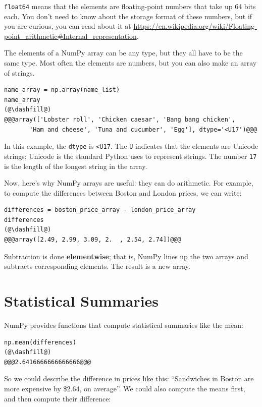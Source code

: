 \passthrough{\lstinline!float64!} means that the elements are
floating-point numbers that take up 64 bits each. You don't need to know
about the storage format of these numbers, but if you are curious, you
can read about it at
\url{https://en.wikipedia.org/wiki/Floating-point_arithmetic\#Internal_representation}.

The elements of a NumPy array can be any type, but they all have to be
the same type. Most often the elements are numbers, but you can also
make an array of strings.

\begin{lstlisting}[]
name_array = np.array(name_list)
name_array
(@\dashfill@)
@@@array(['Lobster roll', 'Chicken caesar', 'Bang bang chicken',
       'Ham and cheese', 'Tuna and cucumber', 'Egg'], dtype='<U17')@@@
\end{lstlisting}

In this example, the \passthrough{\lstinline!dtype!} is
\passthrough{\lstinline!<U17!}. The \passthrough{\lstinline!U!}
indicates that the elements are Unicode strings; Unicode is the standard
Python uses to represent strings. The number
\passthrough{\lstinline!17!} is the length of the longest string in the
array.

Now, here's why NumPy arrays are useful: they can do arithmetic. For
example, to compute the differences between Boston and London prices, we
can write:

\begin{lstlisting}[]
differences = boston_price_array - london_price_array
differences
(@\dashfill@)
@@@array([2.49, 2.99, 3.09, 2.  , 2.54, 2.74])@@@
\end{lstlisting}

Subtraction is done \textbf{elementwise}; that is, NumPy lines up the
two arrays and subtracts corresponding elements. The result is a new
array.

\hypertarget{statistical-summaries}{%
\section{Statistical Summaries}\label{statistical-summaries}}

NumPy provides functions that compute statistical summaries like the
mean:

\begin{lstlisting}[]
np.mean(differences)
(@\dashfill@)
@@@2.6416666666666666@@@
\end{lstlisting}

So we could describe the difference in prices like this: ``Sandwiches in
Boston are more expensive by \$2.64, on average''. We could also compute
the means first, and then compute their difference:

